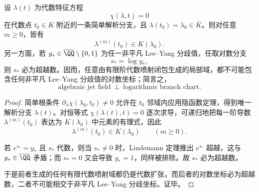 \begin{theorem}[代数喷射场与对数分支坐标的正交性]\label{thm:conclusion-algebraic-jet-field-log-branch-orthogonality}
设 \(\lambda(t)\) 为代数特征方程
\[
\chi(\lambda,t)=0
\]
在代数点 \(t_0\in K\) 附近的一条简单解析分支，且 \(\lambda(t_0)=\lambda_0\in \overline K\)。则对任意 \(m\ge 0\)，皆有
\[
\lambda^{(m)}(t_0)\in K(\lambda_0).
\]
另一方面，若 \(y_\ast\in\overline{\QQ}\setminus\{0,1\}\) 为任一非平凡 Lee--Yang 分歧值，任取对数分支
\[
s_\ast=\log y_\ast,
\]
则 \(s_\ast\) 必为超越数。因而，任意由有限阶代数喷射闭包生成的局部域，都不可能包含任何非平凡 Lee--Yang 分歧值的对数坐标；简言之，
\[
\text{algebraic jet field}\ \perp\ \text{logarithmic branch chart}.
\]
\end{theorem}
\begin{proof}
简单根条件 \(\partial_\lambda\chi(\lambda_0,t_0)\neq 0\) 允许在 \(t_0\) 邻域内应用隐函数定理，得到唯一解析分支 \(\lambda(t)\)。对恒等式 \(\chi(\lambda(t),t)=0\) 逐次求导，可递归地把每一阶导数 \(\lambda^{(m)}(t_0)\) 表达为 \(K(\lambda_0)\) 中元素的有理式，因此
\[
\lambda^{(m)}(t_0)\in K(\lambda_0)
\qquad(m\ge 0).
\]

若 \(e^{s_\ast}=y_\ast\) 且 \(s_\ast\) 代数，则当 \(s_\ast\neq 0\) 时，Lindemann 定理推出 \(e^{s_\ast}\) 超越，这与 \(y_\ast\in\overline{\QQ}\) 矛盾；而 \(s_\ast=0\) 又会导致 \(y_\ast=1\)，同样被排除。故 \(s_\ast\) 必为超越数。

于是前者生成的任何有限代数喷射域都仍是代数扩张，而后者的对数坐标必为超越数，二者不可能相交于非平凡 Lee--Yang 分歧坐标。证毕。
\end{proof}

\endinput

